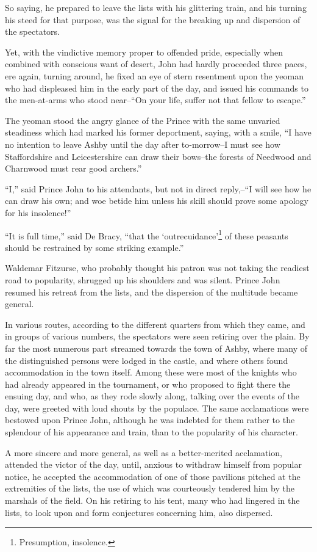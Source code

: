 So saying, he prepared to leave the lists with his glittering train, and
his turning his steed for that purpose, was the signal for the breaking
up and dispersion of the spectators.

Yet, with the vindictive memory proper to offended pride, especially
when combined with conscious want of desert, John had hardly proceeded
three paces, ere again, turning around, he fixed an eye of stern
resentment upon the yeoman who had displeased him in the early part of
the day, and issued his commands to the men-at-arms who stood near--``On
your life, suffer not that fellow to escape.''

The yeoman stood the angry glance of the Prince with the same unvaried
steadiness which had marked his former deportment, saying, with a smile,
``I have no intention to leave Ashby until the day after to-morrow--I
must see how Staffordshire and Leicestershire can draw their bows--the
forests of Needwood and Charnwood must rear good archers.''

``I,'' said Prince John to his attendants, but not in direct reply,--``I
will see how he can draw his own; and woe betide him unless his skill
should prove some apology for his insolence!''

``It is full time,'' said De Bracy, ``that the
`outrecuidance'\footnote{Presumption, insolence.}
of these peasants should be restrained by some striking example.''

Waldemar Fitzurse, who probably thought his patron was not taking the
readiest road to popularity, shrugged up his shoulders and was silent.
Prince John resumed his retreat from the lists, and the dispersion of
the multitude became general.

In various routes, according to the different quarters from which they
came, and in groups of various numbers, the spectators were seen
retiring over the plain. By far the most numerous part streamed towards
the town of Ashby, where many of the distinguished persons were lodged
in the castle, and where others found accommodation in the town itself.
Among these were most of the knights who had already appeared in the
tournament, or who proposed to fight there the ensuing day, and who, as
they rode slowly along, talking over the events of the day, were greeted
with loud shouts by the populace. The same acclamations were bestowed
upon Prince John, although he was indebted for them rather to the
splendour of his appearance and train, than to the popularity of his
character.

A more sincere and more general, as well as a better-merited
acclamation, attended the victor of the day, until, anxious to withdraw
himself from popular notice, he accepted the accommodation of one of
those pavilions pitched at the extremities of the lists, the use of
which was courteously tendered him by the marshals of the field. On his
retiring to his tent, many who had lingered in the lists, to look upon
and form conjectures concerning him, also dispersed.

